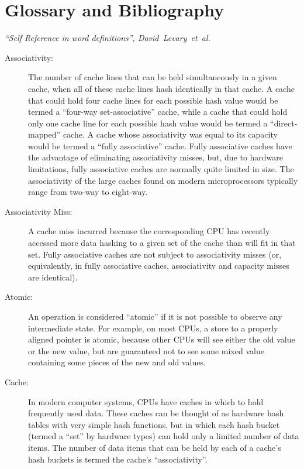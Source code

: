 
\chapter{Glossary and Bibliography}
%
	 {\emph{``Self Reference in word definitions'',
	        David~Levary~et~al.}}

\begin{description}
\item[Associativity:]
	The number of cache lines that can be held simultaneously in
	a given cache, when all of these cache lines hash identically
	in that cache.
	A cache that could hold four cache lines for each possible
	hash value would be termed a ``four-way set-associative'' cache,
	while a cache that could hold only one cache line for each
	possible hash value would be termed a ``direct-mapped'' cache.
	A cache whose associativity was equal to its capacity would
	be termed a ``fully associative'' cache.
	Fully associative caches have the advantage of eliminating
	associativity misses, but, due to hardware limitations,
	fully associative caches are normally quite limited in size.
	The associativity of the large caches found on modern microprocessors
	typically range from two-way to eight-way.
\item[Associativity Miss:]
	A cache miss incurred because the corresponding CPU has recently
	accessed more data hashing to a given set of the cache than will
	fit in that set.
	Fully associative caches are not subject to associativity misses
	(or, equivalently, in fully associative caches, associativity
	and capacity misses are identical).
\item[Atomic:]
	An operation is considered ``atomic'' if it is not possible to
	observe any intermediate state.
	For example, on most CPUs, a store to a properly aligned pointer
	is atomic, because other CPUs will see either the old value or
	the new value, but are guaranteed not to see some mixed value
	containing some pieces of the new and old values.
\item[Cache:]
	In modern computer systems, CPUs have caches in which to hold
	frequently used data.
	These caches can be thought of as hardware hash tables with very
	simple hash functions,
	but in which each hash bucket (termed a ``set'' by hardware types)
	can hold only a limited number of data items.
	The number of data items that can be held by each of a cache's hash
	buckets is termed the cache's ``associativity''.

\end{description}

